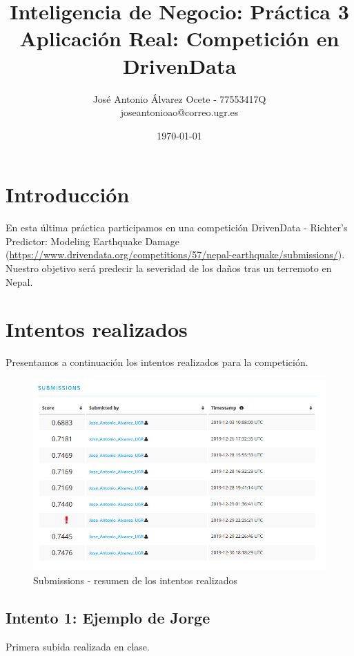 \documentclass[11pt,a4paper]{article}
\title{Inteligencia de Negocio: Práctica 3
	\\\medskip \large Aplicación Real: Competición en DrivenData}
\author{José Antonio Álvarez Ocete - 77553417Q \\ joseantonioao@correo.ugr.es}
\date{ \today }
\begin{document}
	
	
	\maketitle 
	\newpage
	\tableofcontents
	\newpage
	
	\section{Introducción}
	
	En esta última práctica participamos en una competición DrivenData - Richter's Predictor: Modeling Earthquake Damage (\url{https://www.drivendata.org/competitions/57/nepal-earthquake/submissions/}). Nuestro objetivo será predecir la severidad de los daños tras un terremoto en Nepal. 

	\section{Intentos realizados}
	
	Presentamos a continuación los intentos realizados para la competición.
	
	\begin{figure}[H] 
		\centering
		\includegraphics[scale=0.6]{../capturas/submissions}
		\caption{Submissions - resumen de los intentos realizados}
	\end{figure}
	
	
	\subsection{Intento 1: Ejemplo de Jorge}
	
	Primera subida realizada en clase.
	
\end{document}
